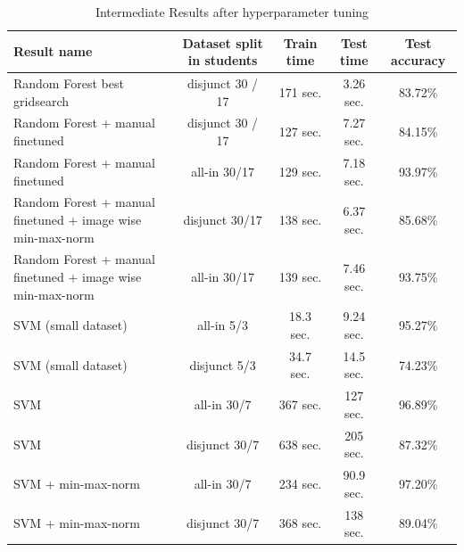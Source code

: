 \documentclass[conference]{IEEEtran}
\begin{document}
\begin{table}[htbp]
    \caption{Intermediate Results after hyperparameter tuning}
    \begin{center}
    \begin{tabular}{|l|c|c|c|c|}
        \hline
        \textbf{Result name} & \textbf{Dataset split in students } & \textbf{Train time} & \textbf{Test time} & \textbf{Test accuracy} \\
        \hline
        Random Forest best gridsearch & disjunct 30 / 17 & 171 sec. & 3.26 sec. & 83.72\% \\
        \hline
        Random Forest + manual finetuned & disjunct 30 / 17 & 127 sec. & 7.27 sec. & 84.15\% \\
        \hline
        Random Forest + manual finetuned & all-in 30/17 & 129 sec. & 7.18 sec. & 93.97\% \\
        \hline
        Random Forest + manual finetuned + image wise min-max-norm & disjunct 30/17 & 138 sec. & 6.37 sec. & 85.68\% \\
        \hline
        Random Forest + manual finetuned + image wise min-max-norm & all-in 30/17 & 139 sec. & 7.46 sec. & 93.75\% \\
        \hline
        SVM (small dataset) & all-in 5/3 & 18.3 sec. & 9.24 sec. & 95.27\% \\
        \hline
        SVM (small dataset) & disjunct 5/3 & 34.7 sec. & 14.5 sec. & 74.23\% \\
        \hline
        SVM  & all-in 30/7 & 367 sec. & 127 sec. & 96.89\% \\
        \hline
        SVM  & disjunct 30/7 & 638 sec. & 205 sec. & 87.32\% \\
        \hline
        SVM + min-max-norm & all-in 30/7 & 234 sec. & 90.9 sec. & 97.20\% \\
        \hline
        SVM + min-max-norm & disjunct 30/7 & 368 sec. & 138 sec. & 89.04\% \\
        \hline

    \end{tabular}
    \label{table:timeIntermediateResults}
    \end{center}
\end{table}
\end{document}
